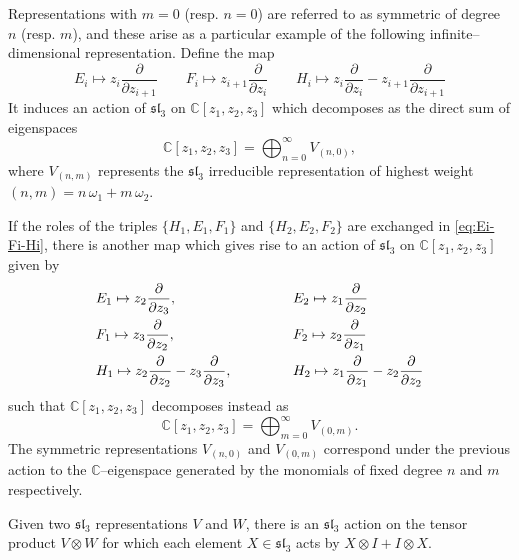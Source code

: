 \documentclass[12pt,oneside,reqno]{amsart}
\def\C{\mathbb{C}}
\numberwithin{teorema}{section}
\numberwithin{definicion}{section}
\numberwithin{lema}{section}
\numberwithin{conjetura}{section}
\numberwithin{proposicion}{section}
\def\sl{\mathfrak{sl}}
\begin{document}
Representations with $m=0$ (resp. $n=0$) are referred to as symmetric of degree $n$ (resp. $m$), and these arise as a particular example of the following infinite--dimensional representation. Define the map
\begin{equation}\label{eq:Ei-Fi-Hi}
    E_i \mapsto z_i\frac{\partial}{\partial z_{i+1}} \hspace{2em} F_i \mapsto z_{i+1}\frac{\partial}{\partial z_{i}} \hspace{2em} H_i \mapsto z_i\frac{\partial}{\partial z_{i}} - z_{i+1}\frac{\partial}{\partial z_{i+1}}
\end{equation}
It induces an action of $\sl_3$ on $\C\left[z_1,z_2,z_3\right]$ which decomposes as the direct sum of eigenspaces
\begin{equation*}
    \C\left[z_1,z_2,z_3\right] = \bigoplus_{n=0}^\infty V_{(n,0)},
\end{equation*}
where $V_{(n,m)}$ represents the $\sl_3$ irreducible representation of highest weight $(n,m)=n\,\omega_1+m\,\omega_2$. 

If the roles of the triples $\{H_1,E_1,F_1\}$ and $\{H_2,E_2,F_2\}$ are exchanged in \eqref{eq:Ei-Fi-Hi}, there is another map which gives rise to an action of $\sl_3$ on $\C\left[z_1,z_2,z_3\right]$ given by
\begin{alignat}{2}
    &E_1 \mapsto z_2\frac{\partial}{\partial z_3}, \hspace{3em} &&E_2\mapsto z_1\frac{\partial}{\partial z_2} \\
    &F_1 \mapsto z_3\frac{\partial}{\partial z_2}, \hspace{3em} &&F_2 \mapsto z_2\frac{\partial}{\partial z_1}\\
    &H_1 \mapsto z_2\frac{\partial}{\partial z_2}-z_3\frac{\partial}{\partial z_3}, \hspace{3.5em} &&H_2\mapsto z_1\frac{\partial}{\partial z_1}-z_2\frac{\partial}{\partial z_2}
\end{alignat}
such that $\C\left[z_1,z_2,z_3\right]$ decomposes instead as
\begin{equation*}
    \C\left[z_1,z_2,z_3\right] = \bigoplus_{m=0}^\infty V_{(0,m)}.
\end{equation*}
The symmetric representations $V_{(n,0)}$ and $V_{(0,m)}$ correspond under the previous action to the $\C$--eigenspace generated by the monomials of fixed degree $n$ and $m$ respectively.

Given two $\sl_3$ representations $V$ and $W$, there is an $\sl_3$ action on the tensor product $V\otimes W$ for which each element $X\in \sl_3$ acts by $X\otimes I + I\otimes X$.
\end{document}

